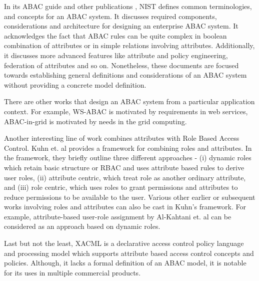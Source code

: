 In its ABAC guide \cite{nist-abac-draft} and other publications \cite{hu2015attribute},  NIST defines common terminologies, and concepts for an ABAC system. It discusses required components, considerations and architecture for designing an  enterprise ABAC system. It acknowledges the fact that ABAC rules can be quite complex in boolean combination of attributes or in simple relations involving attributes. Additionally, it discusses more advanced features like attribute and policy engineering, federation of attributes and so on. Nonetheless, these documents are focused towards establishing general definitions and considerations of an ABAC system without providing a concrete model definition.

There are other works that design an ABAC system from a particular application context. For example, WS-ABAC \cite{abac-ws}  is motivated by requirements in web services, ABAC-in-grid \cite{grid-abac}  is motivated by needs in the grid computing.



Another interesting line of work combines attributes with Role Based Access Control. Kuhn et. al \cite{kuhn2010adding} provides a framework for combining roles and attributes. In the framework, they briefly outline three different approaches - (i) dynamic roles which retain basic structure or RBAC and  uses attribute based rules to derive user roles, (ii) attribute centric,  which treat role as another ordinary attribute, and (iii) role centric, which uses roles to grant permissions and attributes to reduce permissions to be available to the user. Various other earlier or subsequent works involving roles and attributes can also be cast in Kuhn's framework. For example, attribute-based user-role assignment by Al-Kahtani et. al \cite{al2002model} can be considered as an approach based on dynamic roles.

Last but not the least, XACML \cite{xacml} is a declarative access control policy language and processing model which  supports attribute based access control concepts and policies. Although, it lacks a formal definition of an ABAC model, it is notable for its uses in multiple commercial products.